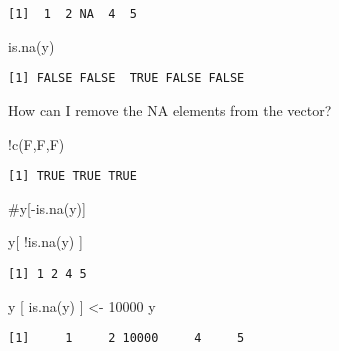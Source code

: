 \documentclass[
  letterpaper,
  DIV=11,
  numbers=noendperiod]{scrartcl}
\newenvironment{Shaded}{\begin{snugshade}}{\end{snugshade}}
\newcommand{\CommentTok}[1]{\textcolor[rgb]{0.37,0.37,0.37}{#1}}
\newcommand{\DecValTok}[1]{\textcolor[rgb]{0.68,0.00,0.00}{#1}}
\newcommand{\FunctionTok}[1]{\textcolor[rgb]{0.28,0.35,0.67}{#1}}
\newcommand{\NormalTok}[1]{\textcolor[rgb]{0.00,0.23,0.31}{#1}}
\newcommand{\OtherTok}[1]{\textcolor[rgb]{0.00,0.23,0.31}{#1}}
\newcommand{\SpecialCharTok}[1]{\textcolor[rgb]{0.37,0.37,0.37}{#1}}
\begin{document}
\begin{verbatim}
[1]  1  2 NA  4  5
\end{verbatim}

\begin{Shaded}
\begin{Highlighting}[]
\FunctionTok{is.na}\NormalTok{(y)}
\end{Highlighting}
\end{Shaded}

\begin{verbatim}
[1] FALSE FALSE  TRUE FALSE FALSE
\end{verbatim}

How can I remove the NA elements from the vector?

\begin{Shaded}
\begin{Highlighting}[]
\SpecialCharTok{!}\FunctionTok{c}\NormalTok{(F,F,F)}
\end{Highlighting}
\end{Shaded}

\begin{verbatim}
[1] TRUE TRUE TRUE
\end{verbatim}

\begin{Shaded}
\begin{Highlighting}[]
\CommentTok{\#y[{-}is.na(y)]}
\end{Highlighting}
\end{Shaded}

\begin{Shaded}
\begin{Highlighting}[]
\NormalTok{y[ }\SpecialCharTok{!}\FunctionTok{is.na}\NormalTok{(y) ]}
\end{Highlighting}
\end{Shaded}

\begin{verbatim}
[1] 1 2 4 5
\end{verbatim}

\begin{Shaded}
\begin{Highlighting}[]
\NormalTok{y [ }\FunctionTok{is.na}\NormalTok{(y) ] }\OtherTok{\textless{}{-}} \DecValTok{10000}
\NormalTok{y}
\end{Highlighting}
\end{Shaded}

\begin{verbatim}
[1]     1     2 10000     4     5
\end{verbatim}
\end{document}
